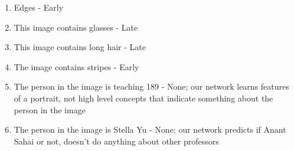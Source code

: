 \begin{Parts}
\begin{enumerate}
\end{enumerate}

\begin{solution}
\begin{enumerate}
\item Edges - Early
\item This image contains glasses - Late
\item This image contains long hair - Late
\item The image contains stripes - Early
\item The person in the image is teaching 189 - None; our network learns features of a portrait, not high level concepts that indicate something about the person in the image
\item The person in the image is Stella Yu - None; our network predicts if Anant Sahai or not, doesn't do anything about other professors

\end{enumerate}
\end{solution}


\end{Parts}
